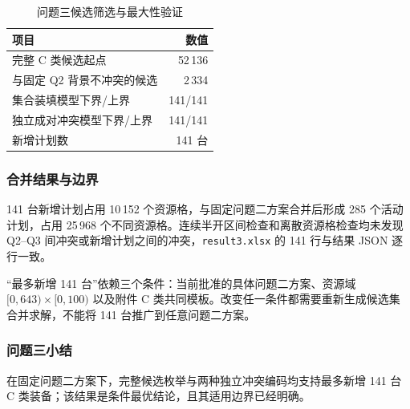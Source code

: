 \begin{table}[H]
\centering
\caption{问题三候选筛选与最大性验证}
\label{tab:q3-result}
\begin{tabular}{lr}
\toprule
项目 & 数值 \\
\midrule
完整 C 类候选起点 & 52\,136 \\
与固定 Q2 背景不冲突的候选 & 2\,334 \\
集合装填模型下界/上界 & 141/141 \\
独立成对冲突模型下界/上界 & 141/141 \\
新增计划数 & 141 台 \\
\bottomrule
\end{tabular}
\end{table}

\subsubsection{合并结果与边界}
141 台新增计划占用 10\,152 个资源格，与固定问题二方案合并后形成 285 个活动计划，占用 25\,968 个不同资源格。连续半开区间检查和离散资源格检查均未发现 Q2--Q3 间冲突或新增计划之间的冲突，\texttt{result3.xlsx} 的 141 行与结果 JSON 逐行一致。

“最多新增 141 台”依赖三个条件：当前批准的具体问题二方案、资源域 \([0,643)\times[0,100)\) 以及附件 C 类共同模板。改变任一条件都需要重新生成候选集合并求解，不能将 141 台推广到任意问题二方案。

\subsubsection{问题三小结}
在固定问题二方案下，完整候选枚举与两种独立冲突编码均支持最多新增 141 台 C 类装备；该结果是条件最优结论，且其适用边界已经明确。
